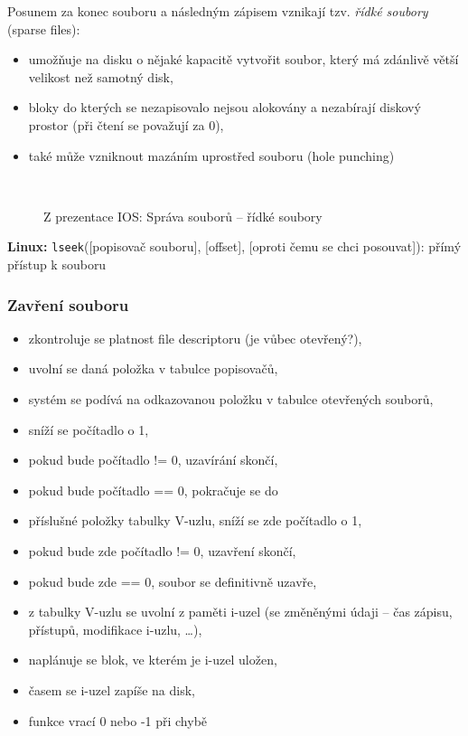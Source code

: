 \documentclass[a4paper, 11pt]{article}
\newcommand{\tcmd}[1]{\texttt{#1}}
\begin{document}
Posunem za konec souboru a následným zápisem vznikají tzv. \emph{řídké soubory} (sparse files):
\begin{itemize}
    \item umožňuje na disku o nějaké kapacitě vytvořit soubor, který má zdánlivě větší velikost než samotný disk,
    \item bloky do kterých se nezapisovalo nejsou alokovány a nezabírají diskový prostor (při čtení se považují za 0),
    \item také může vzniknout mazáním uprostřed souboru (hole punching)
\end{itemize}
 
\begin{figure} [ht]
    \centering
     \\
    \caption{Z prezentace IOS: Správa souborů -- řídké soubory} 
\end{figure}
 
\textbf{Linux:}
\tcmd{lseek}([popisovač souboru], [offset], [oproti čemu se chci posouvat]): přímý přístup k souboru
 
\newpage

\subsubsection{Zavření souboru}
\begin{itemize}
    \item zkontroluje se platnost file descriptoru (je vůbec otevřený?),
    \item uvolní se daná položka v tabulce popisovačů,
    \item systém se podívá na odkazovanou položku v tabulce otevřených souborů,
    \item sníží se počítadlo o 1,
    \item pokud bude počítadlo != 0, uzavírání skončí,
    \item pokud bude počítadlo == 0, pokračuje se do 
    \item příslušné položky tabulky V-uzlu, sníží se zde počítadlo o 1,
    \item pokud bude zde počítadlo != 0, uzavření skončí,
    \item pokud bude zde == 0, soubor se definitivně uzavře,
    \item z tabulky V-uzlu se uvolní z paměti i-uzel (se změněnými údaji -- čas zápisu, přístupů, modifikace i-uzlu, \ldots),
    \item naplánuje se blok, ve kterém je i-uzel uložen,
    \item časem se i-uzel zapíše na disk,
    \item funkce vrací 0 nebo -1 při chybě
\end{itemize}
 
\end{document}

